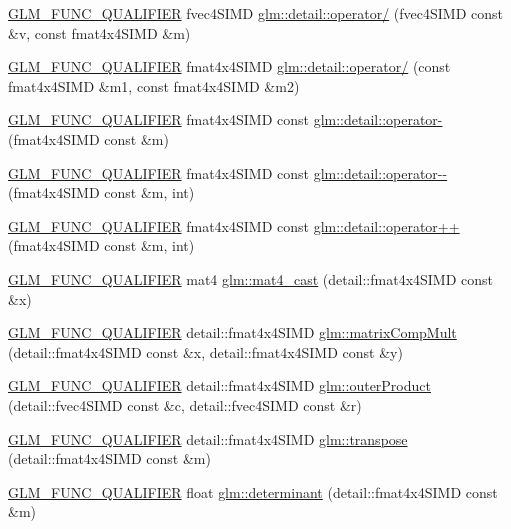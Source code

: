 \begin{DoxyCompactItemize}
\item 
\hyperlink{setup_8hpp_a33fdea6f91c5f834105f7415e2a64407}{G\+L\+M\+\_\+\+F\+U\+N\+C\+\_\+\+Q\+U\+A\+L\+I\+F\+I\+ER} fvec4\+S\+I\+MD \hyperlink{namespaceglm_1_1detail_a147045f9002e1195039f968a2396c435}{glm\+::detail\+::operator/} (fvec4\+S\+I\+MD const \&v, const fmat4x4\+S\+I\+MD \&m)
\item 
\hyperlink{setup_8hpp_a33fdea6f91c5f834105f7415e2a64407}{G\+L\+M\+\_\+\+F\+U\+N\+C\+\_\+\+Q\+U\+A\+L\+I\+F\+I\+ER} fmat4x4\+S\+I\+MD \hyperlink{namespaceglm_1_1detail_ace681b03cfb7d72e2633dc06d4cee962}{glm\+::detail\+::operator/} (const fmat4x4\+S\+I\+MD \&m1, const fmat4x4\+S\+I\+MD \&m2)
\item 
\hyperlink{setup_8hpp_a33fdea6f91c5f834105f7415e2a64407}{G\+L\+M\+\_\+\+F\+U\+N\+C\+\_\+\+Q\+U\+A\+L\+I\+F\+I\+ER} fmat4x4\+S\+I\+MD const \hyperlink{namespaceglm_1_1detail_a7f0cc16af5799679034230c9cea81b10}{glm\+::detail\+::operator-\/} (fmat4x4\+S\+I\+MD const \&m)
\item 
\hyperlink{setup_8hpp_a33fdea6f91c5f834105f7415e2a64407}{G\+L\+M\+\_\+\+F\+U\+N\+C\+\_\+\+Q\+U\+A\+L\+I\+F\+I\+ER} fmat4x4\+S\+I\+MD const \hyperlink{namespaceglm_1_1detail_a37b1c3ee6bcd2c5e56d49e2ea90f4ee5}{glm\+::detail\+::operator-\/-\/} (fmat4x4\+S\+I\+MD const \&m, int)
\item 
\hyperlink{setup_8hpp_a33fdea6f91c5f834105f7415e2a64407}{G\+L\+M\+\_\+\+F\+U\+N\+C\+\_\+\+Q\+U\+A\+L\+I\+F\+I\+ER} fmat4x4\+S\+I\+MD const \hyperlink{namespaceglm_1_1detail_afef703ea9bc24f3b3abbcc36e5ef65bb}{glm\+::detail\+::operator++} (fmat4x4\+S\+I\+MD const \&m, int)
\item 
\hyperlink{setup_8hpp_a33fdea6f91c5f834105f7415e2a64407}{G\+L\+M\+\_\+\+F\+U\+N\+C\+\_\+\+Q\+U\+A\+L\+I\+F\+I\+ER} mat4 \hyperlink{namespaceglm_aaea24a8e252f68832f4d368be2035889}{glm\+::mat4\+\_\+cast} (detail\+::fmat4x4\+S\+I\+MD const \&x)
\item 
\hyperlink{setup_8hpp_a33fdea6f91c5f834105f7415e2a64407}{G\+L\+M\+\_\+\+F\+U\+N\+C\+\_\+\+Q\+U\+A\+L\+I\+F\+I\+ER} detail\+::fmat4x4\+S\+I\+MD \hyperlink{namespaceglm_a3f8b69f9fddfae106e1a18ad66a17a1a}{glm\+::matrix\+Comp\+Mult} (detail\+::fmat4x4\+S\+I\+MD const \&x, detail\+::fmat4x4\+S\+I\+MD const \&y)
\item 
\hyperlink{setup_8hpp_a33fdea6f91c5f834105f7415e2a64407}{G\+L\+M\+\_\+\+F\+U\+N\+C\+\_\+\+Q\+U\+A\+L\+I\+F\+I\+ER} detail\+::fmat4x4\+S\+I\+MD \hyperlink{namespaceglm_a24beb25b08989724431540bb9279937c}{glm\+::outer\+Product} (detail\+::fvec4\+S\+I\+MD const \&c, detail\+::fvec4\+S\+I\+MD const \&r)
\item 
\hyperlink{setup_8hpp_a33fdea6f91c5f834105f7415e2a64407}{G\+L\+M\+\_\+\+F\+U\+N\+C\+\_\+\+Q\+U\+A\+L\+I\+F\+I\+ER} detail\+::fmat4x4\+S\+I\+MD \hyperlink{namespaceglm_a8a85a6f79193f0789bd2ed17802b70f6}{glm\+::transpose} (detail\+::fmat4x4\+S\+I\+MD const \&m)
\item 
\hyperlink{setup_8hpp_a33fdea6f91c5f834105f7415e2a64407}{G\+L\+M\+\_\+\+F\+U\+N\+C\+\_\+\+Q\+U\+A\+L\+I\+F\+I\+ER} float \hyperlink{namespaceglm_a3d33b661dfd45c27b41440cd02605c05}{glm\+::determinant} (detail\+::fmat4x4\+S\+I\+MD const \&m)
\end{DoxyCompactItemize}
